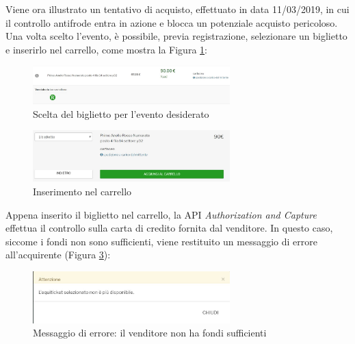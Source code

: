 Viene ora illustrato un tentativo di acquisto, effettuato in data 11/03/2019, in cui il controllo antifrode entra in azione e blocca un potenziale acquisto pericoloso. 
Una volta scelto l'evento, è possibile, previa registrazione, selezionare un biglietto e inserirlo nel carrello, come mostra la Figura \ref{acq1}: 
\begin{figure}[htbp]
	\centering
	\includegraphics[width=0.68\textwidth]{chapter4/immagini/acquisto1}
	\caption{Scelta del biglietto per l'evento desiderato}
	\label{acq1}
\end{figure}
\begin{figure}[htbp]
	\centering
	\includegraphics[width=0.68\textwidth]{chapter4/immagini/acquisto2}
	\caption{Inserimento nel carrello}
	\label{acq2}
\end{figure}
Appena inserito il biglietto nel carrello, la API \textit{Authorization and Capture} effettua il controllo sulla carta di credito fornita dal venditore. In questo caso, siccome i fondi non sono sufficienti, viene restituito un messaggio di errore all'acquirente (Figura \ref{fail1}):
\begin{figure}[htbp]
	\centering
	\includegraphics[width=0.68\textwidth]{chapter4/immagini/acquisto3}
	\caption{Messaggio di errore: il venditore non ha fondi sufficienti}
	\label{fail1}
\end{figure} 

